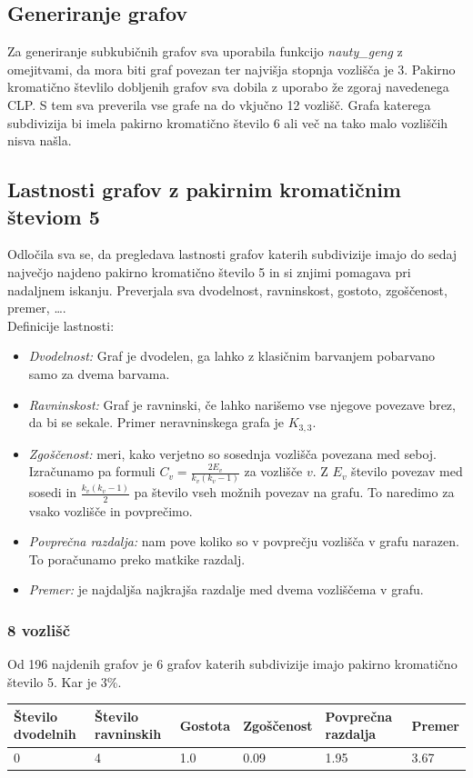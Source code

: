 \documentclass[11pt,a4paper,titlepage]{article}
\begin{document}
\subsection{Generiranje grafov}
Za generiranje subkubičnih grafov sva uporabila funkcijo \emph{nauty\_geng} z omejitvami, da mora biti graf povezan ter najvišja stopnja vozlišča je 3. Pakirno kromatično števlilo dobljenih grafov sva dobila z uporabo že zgoraj navedenega CLP. S tem sva preverila vse grafe na do vkjučno 12 vozlišč. Grafa katerega subdivizija bi imela pakirno kromatično število 6 ali več na tako malo vozliščih nisva našla.

\subsection{Lastnosti grafov z pakirnim kromatičnim števiom 5}
Odločila sva se, da pregledava lastnosti grafov katerih subdivizije imajo do sedaj največjo najdeno pakirno kromatično število 5 in si znjimi pomagava pri nadaljnem iskanju. Preverjala sva dvodelnost, ravninskost, gostoto, zgoščenost, premer, \dots.\\
Definicije lastnosti:
\begin{itemize}
	\item \emph{Dvodelnost:} Graf je dvodelen, ga lahko z klasičnim barvanjem pobarvano samo za dvema barvama.
	\item  \emph{Ravninskost:} Graf je ravninski, če lahko narišemo vse njegove povezave brez, da bi se sekale. Primer neravninskega grafa je $K_{3,3}$.
	\item  \emph{Zgoščenost:} meri, kako verjetno so sosednja vozlišča povezana med seboj. Izračunamo pa formuli $C_v = \frac{2E_v}{k_v(k_v-1)}$ za vozlišče $v$. Z $E_v$ število povezav med sosedi in $\frac{k_v(k_v-1)}{2}$ pa število vseh možnih povezav na grafu. To naredimo za vsako vozlišče in povprečimo.
	\item \emph{Povprečna razdalja:} nam pove koliko so v povprečju vozlišča v grafu narazen. To poračunamo preko matkike razdalj.
	\item  \emph{Premer:} je najdaljša najkrajša razdalje med dvema vozliščema v grafu. 
\end{itemize}



\subsubsection{8 vozlišč}
Od 196 najdenih grafov je 6 grafov katerih subdivizije imajo pakirno kromatično število 5. Kar je 3\%. 
\begin{table}[H]
	\begin{tabular}{|l|l|l|l|l|l|}
		\hline
		Število dvodelnih	& Število ravninskih  & Gostota  & Zgoščenost & Povprečna razdalja & Premer \\ \hline
		0 & 4 & 1.0 & 0.09 & 1.95 & 3.67  \\ \hline
	\end{tabular}
\end{table}
\end{document}

